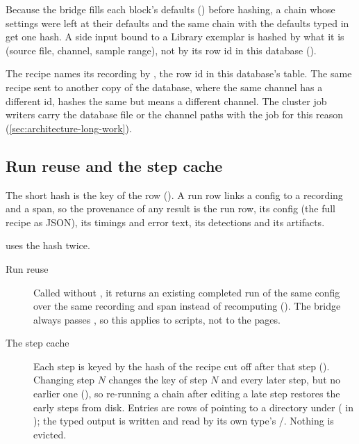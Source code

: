 Because the bridge fills each block's defaults () before hashing, a chain
whose settings were left at their defaults and the same chain with the defaults typed in get one
hash. A side input bound to a Library exemplar is hashed by what it is (source file, channel, sample
range), not by its row id in this database ().

\begin{watchout}
The recipe names its recording by , the row id in this database's
 table. The same recipe sent to another copy of the database, where the same
channel has a different id, hashes the same but means a different channel. The cluster job
writers carry the database file or the channel paths with the job for this reason
(\cref{sec:architecture-long-work}).
\end{watchout}

\subsection{Run reuse and the step cache}
The short hash is the key of the  row (). A run row links
a config to a recording and a span, so the provenance of any result is the run row, its config (the
full recipe as JSON), its timings and error text, its detections and its artifacts.

 uses the hash twice.
\begin{description}
\item[Run reuse] Called without , it returns an existing completed run of the same
  config over the same recording and span instead of recomputing (). The
  bridge always passes , so this applies to scripts, not to the pages.
\item[The step cache] Each step is keyed by the hash of the recipe cut off after that step
  (). Changing step $N$ changes the key of step $N$ and every later step,
  but no earlier one (), so re-running a chain after editing a late
  step restores the early steps from disk. Entries are rows of  pointing to a
  directory under  ( in
  ); the typed output is written and read by its own type's
  /. Nothing is evicted.
\end{description}

